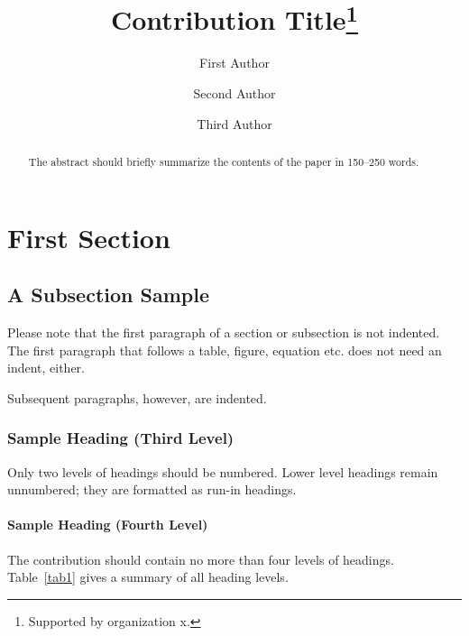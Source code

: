 \documentclass[runningheads]{llncs}
\begin{document}
%
\title{Contribution Title\thanks{Supported by organization x.}}
%
%
\author{First Author \and
Second Author \and
Third Author}
%
%
%
\maketitle              %
%
\begin{abstract}
The abstract should briefly summarize the contents of the paper in
150--250 words.

\end{abstract}
%
%
%
\section{First Section}
\subsection{A Subsection Sample}
Please note that the first paragraph of a section or subsection is
not indented. The first paragraph that follows a table, figure,
equation etc. does not need an indent, either.

Subsequent paragraphs, however, are indented.

\subsubsection{Sample Heading (Third Level)} Only two levels of
headings should be numbered. Lower level headings remain unnumbered;
they are formatted as run-in headings.

\paragraph{Sample Heading (Fourth Level)}
The contribution should contain no more than four levels of
headings. Table~\ref{tab1} gives a summary of all heading levels.
\end{document}
